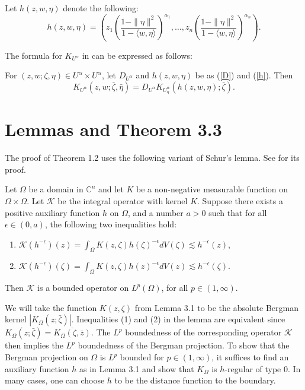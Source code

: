 \documentclass[reqno,12pt]{amsart}
\numberwithin{equation}{section}
\begin{document}
Let $h(z,w,\eta)$ denote the following:
\begin{equation}\label{h}
h\left(z,w,\eta\right)=\left(z_1\left(\frac{1-\|\eta\|^2}{1-\langle w, \eta\rangle}\right)^{\alpha_1},\dots,z_n\left(\frac{1-\|\eta\|^2}{1-\langle w,\eta\rangle}\right)^{\alpha_n}\right).
\end{equation}

The formula for $K_{U^{\alpha}}$ in \cite{Zhenghui} can be expressed as follows:
\begin{thm}For {$(z,w;\zeta,\eta)\in U^{\alpha}\times U^{\alpha}$}, let $D_{U^{\alpha}}$ and $h(z,w,\eta)$  be as (\ref{D}) and (\ref{h}). Then
{\begin{equation}\label{3}
	K_{U^{\alpha}}\left(z,w;\bar \zeta,\bar \eta\right)=D_{U^{\alpha}}K_{U^{\alpha}_{\eta}}\left(h(z,w,\eta);\bar\zeta\right).
	\end{equation}}
\end{thm}
\section{Lemmas and Theorem 3.3}
The proof of Theorem 1.2 uses the following variant of Schur's {lemma}. See \cite{EM} for its proof. 
\begin{lem}
	Let $\Omega$ be a domain in $\mathbb C^n$ and let $K$ be a non-negative measurable function on $\Omega\times\Omega$. Let $\mathcal K$ be the integral operator with kernel $K$. Suppose there exists a positive auxiliary function $h$ on $\Omega$,  and a number $a>0$ such that for all $\epsilon\in (0,a)$, the following two inequalities hold:
	\begin{enumerate}
		\item $\mathcal K(h^{-\epsilon})(z)=\int_{\Omega}K(z,{\zeta})h({\zeta})^{-\epsilon}dV({\zeta})\lesssim h^{-\epsilon}(z)$,
		\item $\mathcal K(h^{-\epsilon})({\zeta})=\int_{\Omega}K(z,{\zeta})h(z)^{-\epsilon}dV(z)\lesssim h^{-\epsilon}({\zeta})$.
		\end{enumerate} 
		Then $\mathcal K$ is a bounded operator on $L^p(\Omega)$, for all $p\in (1,\infty)$.
		\end{lem}
	
		{We will take the function $K(z,\zeta)$ from Lemma 3.1 to be the absolute Bergman kernel $|K_{\Omega}(z;\bar \zeta)|$.} Inequalities (1) and (2) in the lemma are equivalent since {$K_{\Omega}(z;\bar \zeta)=\overline{K_{\Omega}(\zeta,\bar z)}$}. The $L^p$ boundedness of the corresponding operator $\mathcal K$ then implies the $L^p$ boundedness of the Bergman projection. To show that the Bergman projection on $\Omega$ is $L^p$ bounded for $p\in (1,\infty)$, it suffices to find an auxiliary function $h$ as in Lemma 3.{1} and show that $K_{\Omega}$ is $h$-regular of type $0$. {In many cases,} one can choose $h$ to be the distance function to the boundary.
	
\end{document}
